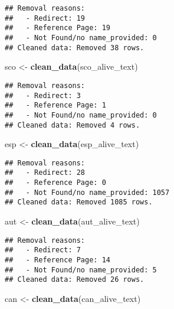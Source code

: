 \documentclass[
]{article}
\newenvironment{Shaded}{\begin{snugshade}}{\end{snugshade}}
\newcommand{\FunctionTok}[1]{\textcolor[rgb]{0.13,0.29,0.53}{\textbf{#1}}}
\newcommand{\NormalTok}[1]{#1}
\newcommand{\OtherTok}[1]{\textcolor[rgb]{0.56,0.35,0.01}{#1}}
\begin{document}
\begin{verbatim}
## Removal reasons:
##   - Redirect: 19 
##   - Reference Page: 19 
##   - Not Found/no name_provided: 0 
## Cleaned data: Removed 38 rows.
\end{verbatim}

\begin{Shaded}
\begin{Highlighting}[]
\NormalTok{sco }\OtherTok{\textless{}{-}} \FunctionTok{clean\_data}\NormalTok{(sco\_alive\_text)}
\end{Highlighting}
\end{Shaded}

\begin{verbatim}
## Removal reasons:
##   - Redirect: 3 
##   - Reference Page: 1 
##   - Not Found/no name_provided: 0 
## Cleaned data: Removed 4 rows.
\end{verbatim}

\begin{Shaded}
\begin{Highlighting}[]
\NormalTok{esp }\OtherTok{\textless{}{-}} \FunctionTok{clean\_data}\NormalTok{(esp\_alive\_text)}
\end{Highlighting}
\end{Shaded}

\begin{verbatim}
## Removal reasons:
##   - Redirect: 28 
##   - Reference Page: 0 
##   - Not Found/no name_provided: 1057 
## Cleaned data: Removed 1085 rows.
\end{verbatim}

\begin{Shaded}
\begin{Highlighting}[]
\NormalTok{aut }\OtherTok{\textless{}{-}} \FunctionTok{clean\_data}\NormalTok{(aut\_alive\_text)}
\end{Highlighting}
\end{Shaded}

\begin{verbatim}
## Removal reasons:
##   - Redirect: 7 
##   - Reference Page: 14 
##   - Not Found/no name_provided: 5 
## Cleaned data: Removed 26 rows.
\end{verbatim}

\begin{Shaded}
\begin{Highlighting}[]
\NormalTok{can }\OtherTok{\textless{}{-}} \FunctionTok{clean\_data}\NormalTok{(can\_alive\_text)}
\end{Highlighting}
\end{Shaded}
\end{document}

